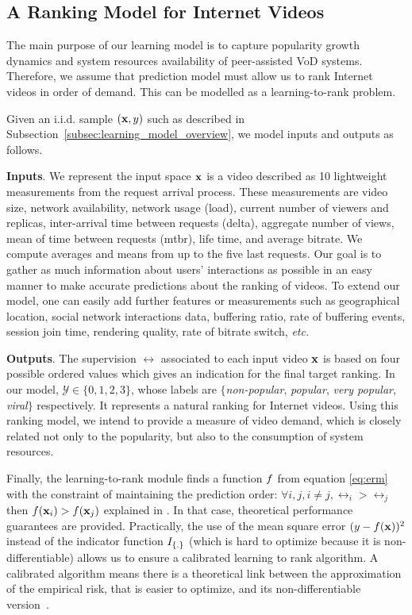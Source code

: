\subsection{A Ranking Model for Internet Videos}
\label{subsec:learning_model_details}

The main purpose of our learning model is to capture popularity growth dynamics and system resources availability of peer-assisted VoD systems. Therefore, we assume that prediction model must allow us to rank Internet videos in order of demand. This can be modelled as a learning-to-rank problem. 

Given an i.i.d. sample $({\bf x},y)$ such as described in Subsection~\ref{subsec:learning_model_overview}, we model inputs and outputs as follows. 

\noindent
\textbf{Inputs}. We represent the input space ${\bf x}$ is a video described as 10 lightweight measurements from the request arrival process.  These measurements are video size, network availability, network usage (load), current number of viewers and replicas, inter-arrival time between requests (delta), aggregate number of views, mean of time between requests (mtbr), life time, and average bitrate. We compute averages and means from up to the five last requests. Our goal is to gather as much information about users' interactions as possible in an easy manner to make accurate predictions about the ranking of videos. To extend our model, one can easily add further features or measurements such as geographical location, social network interactions data, buffering ratio, rate of buffering events, session join time, rendering quality, rate of bitrate switch, \emph{etc.}

\noindent
\textbf{Outputs}. The supervision $\rel$ associated to each input video ${\bf x}$ is based on four possible ordered values which gives an indication for the final target ranking. In our model, $\mathcal{Y} \in \{0,1,2,3\}$, whose labels are $\{$\emph{non-popular}, \emph{popular}, \emph{very popular}, \emph{viral}$\}$ respectively. It represents a natural ranking for Internet videos. Using this ranking model, we intend to provide a measure of video demand, which is closely related not only to the popularity, but also to the consumption of system resources.

Finally, the learning-to-rank module finds a function $f$ from equation \eqref{eq:erm} with the constraint of maintaining the prediction order: $\forall i,j, i \neq j, \rel_i > \rel_j$ then $f({\bf x}_i) > f({\bf x}_j)$ explained in \cite{Buffoni11}. 
In that case, theoretical performance guarantees are provided. Practically, the use of the mean square error $(y - f({\bf x}))^2$ instead of the indicator function  $I_{\left \{ . \right \}}$ (which is hard to optimize because it is non-differentiable) allows us to ensure a calibrated learning to rank algorithm. 
A calibrated algorithm means there is a theoretical link between the approximation of 
the empirical risk, that is easier to optimize, and its non-differentiable version~\cite{Zhang03,Steinwart07,Buffoni11,Calauzenes12}.

